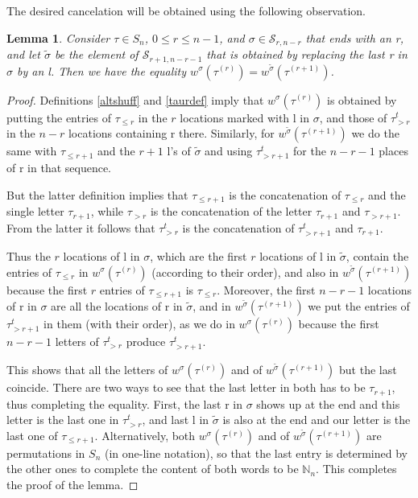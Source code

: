 \documentclass{article}
\newtheorem{lem}[thm]{Lemma}
\theoremstyle{definition}
\begin{document}
\medskip

The desired cancelation will be obtained using the following observation.
\begin{lem}
Consider $\tau \in S_{n}$, $0 \leq r \leq n-1$, and $\sigma\in\mathcal{S}_{r,n-r}$ that ends with an r, and let $\tilde{\sigma}$ be the element of $\mathcal{S}_{r+1,n-r-1}$ that is obtained by replacing the last r in $\sigma$ by an l. Then we have the equality $w^{\sigma}(\tau^{(r)})=w^{\tilde{\sigma}}(\tau^{(r+1)})$. \label{forcanc}
\end{lem}

\begin{proof}
Definitions \ref{altshuff} and \ref{taurdef} imply that $w^{\sigma}(\tau^{(r)})$ is obtained by putting the entries of $\tau_{\leq r}$ in the $r$ locations marked with l in $\sigma$, and those of $\tau_{>r}^{t}$ in the $n-r$ locations containing r there. Similarly, for $w^{\tilde{\sigma}}(\tau^{(r+1)})$ we do the same with $\tau_{\leq r+1}$ and the $r+1$ l's of $\tilde{\sigma}$ and using $\tau_{>r+1}^{t}$ for the $n-r-1$ places of r in that sequence.

But the latter definition implies that $\tau_{\leq r+1}$ is the concatenation of $\tau_{\leq r}$ and the single letter $\tau_{r+1}$, while $\tau_{>r}$ is the concatenation of the letter $\tau_{r+1}$ and $\tau_{>r+1}$. From the latter it follows that $\tau_{>r}^{t}$ is the concatenation of $\tau_{>r+1}^{t}$ and $\tau_{r+1}$.

Thus the $r$ locations of l in $\sigma$, which are the first $r$ locations of l in $\tilde{\sigma}$, contain the entries of $\tau_{\leq r}$ in $w^{\sigma}(\tau^{(r)})$ (according to their order), and also in $w^{\tilde{\sigma}}(\tau^{(r+1)})$ because the first $r$ entries of $\tau_{\leq r+1}$ is $\tau_{\leq r}$. Moreover, the first $n-r-1$ locations of r in $\sigma$ are all the locations of r in $\tilde{\sigma}$, and in $w^{\tilde{\sigma}}(\tau^{(r+1)})$ we put the entries of $\tau_{>r+1}^{t}$ in them (with their order), as we do in $w^{\sigma}(\tau^{(r)})$ because the first $n-r-1$ letters of $\tau_{>r}^{t}$ produce $\tau_{>r+1}^{t}$.

This shows that all the letters of $w^{\sigma}(\tau^{(r)})$ and of $w^{\tilde{\sigma}}(\tau^{(r+1)})$ but the last coincide. There are two ways to see that the last letter in both has to be $\tau_{r+1}$, thus completing the equality. First, the last r in $\sigma$ shows up at the end and this letter is the last one in $\tau_{>r}^{t}$, and last l in $\tilde{\sigma}$ is also at the end and our letter is the last one of $\tau_{\leq r+1}$. Alternatively, both $w^{\sigma}(\tau^{(r)})$ and of $w^{\tilde{\sigma}}(\tau^{(r+1)})$ are permutations in $S_{n}$ (in one-line notation), so that the last entry is determined by the other ones to complete the content of both words to be $\mathbb{N}_{n}$. This completes the proof of the lemma.
\end{proof}
\end{document}
